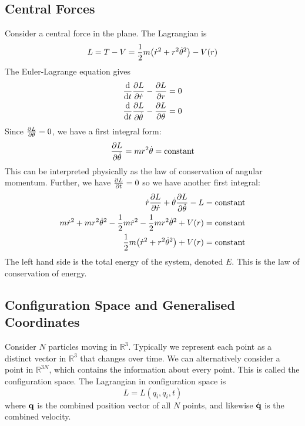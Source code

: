 \subsection{Central Forces}
\begin{example}
    Consider a central force in the plane. The Lagrangian is
    \[ L = T - V = \frac{1}{2}m\qty(\dot r^2 + r^2 \dot \theta^2) - V(r) \]
    The Euler-Lagrange equation gives
    \begin{align*}
        \dv{t}\pdv{L}{\dot r} - \pdv{L}{r} &= 0 \\
        \dv{t}\pdv{L}{\dot \theta} - \pdv{L}{\theta} &= 0
    \end{align*}
    Since \( \pdv{L}{\theta} = 0 \), we have a first integral form:
    \[ \pdv{L}{\dot \theta} = mr^2 \dot \theta = \text{constant} \]
    This can be interpreted physically as the law of conservation of angular momentum.
    Further, we have \( \pdv{L}{t} = 0 \) so we have another first integral:
    \begin{align*}
        \dot r \pdv{L}{\dot r} + \dot\theta \pdv{L}{\dot\theta} - L &= \text{constant} \\
        m\dot r^2 + mr^2\dot\theta^2 - \frac{1}{2}m\dot r^2 - \frac{1}{2}mr^2\dot\theta^2 + V(r) &= \text{constant} \\
        \frac{1}{2} m \qty( \dot r^2 + r^2\dot\theta^2 ) + V(r) &= \text{constant}
    \end{align*}
    The left hand side is the total energy of the system, denoted \( E \). This is the law of conservation of energy.
\end{example}

\subsection{Configuration Space and Generalised Coordinates}
\begin{example}
    Consider \( N \) particles moving in \( \mathbb R^3 \). Typically we represent each point as a distinct vector in \( \mathbb R^3 \) that changes over time.
    We can alternatively consider a point in \( \mathbb R^{3N} \), which contains the information about every point.
    This is called the configuration space.
    The Lagrangian in configuration space is
    \[ L = L(q_i, \dot {q_i}, t) \]
    where \( \vb q \) is the combined position vector of all \( N \) points, and likewise \( \dot{\vb q} \) is the combined velocity.
\end{example}

